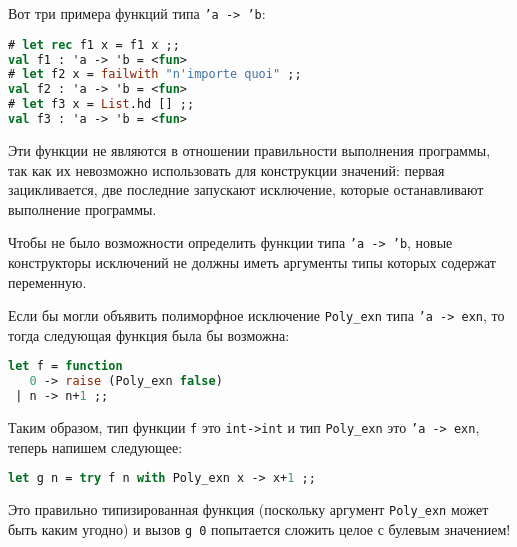 Вот три примера функций типа \texttt{'a -> 'b}:

\begin{lstlisting}[language=OCaml]
# let rec f1 x = f1 x ;;
val f1 : 'a -> 'b = <fun>
# let f2 x = failwith "n'importe quoi" ;;
val f2 : 'a -> 'b = <fun>
# let f3 x = List.hd [] ;;
val f3 : 'a -> 'b = <fun>
\end{lstlisting}

Эти функции не являются  в отношении правильности выполнения
программы, так как их невозможно использовать для конструкции значений: первая
зацикливается, две последние запускают исключение, которые останавливают
выполнение программы.

Чтобы не было возможности определить функции типа \texttt{'a -> 'b}, новые
конструкторы исключений не должны иметь аргументы типы которых содержат
переменную.

Если бы могли объявить полиморфное исключение \texttt{Poly\_exn} типа \texttt{'a
-> exn}, то тогда следующая функция была бы возможна:

\begin{lstlisting}[language=OCaml]
let f = function
   0 -> raise (Poly_exn false)
 | n -> n+1 ;;
\end{lstlisting}

Таким образом, тип функции \texttt{f} это \texttt{int->int} и тип
\texttt{Poly\_exn} это \texttt{'a -> exn}, теперь напишем следующее:

\begin{lstlisting}[language=OCaml]
let g n = try f n with Poly_exn x -> x+1 ;;
\end{lstlisting}

Это правильно типизированная функция (поскольку аргумент \texttt{Poly\_exn}
может быть каким угодно) и вызов \texttt{g 0} попытается сложить целое с булевым
значением!


